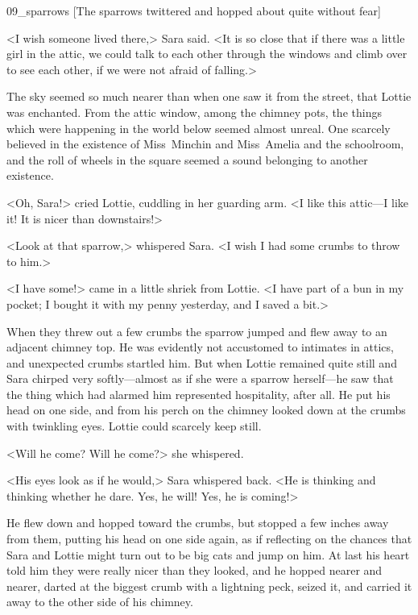 \begin{colorbigpic}
	[\basicscale]
	{09_sparrows}
	[The sparrows twittered and hopped about quite without fear]
\end{colorbigpic}

<I wish someone lived there,> Sara said. <It is so close that if there was a little girl in the attic, we could talk to each other through the windows and climb over to see each other, if we were not afraid of falling.>

The sky seemed so much nearer than when one saw it from the street, that Lottie was enchanted. From the attic window, among the chimney pots, the things which were happening in the world below seemed almost unreal. One scarcely believed in the existence of Miss~Minchin and Miss~Amelia and the schoolroom, and the roll of wheels in the square seemed a sound belonging to another existence.

<Oh, Sara!> cried Lottie, cuddling in her guarding arm. <I like this attic—I like it! It is nicer than downstairs!>

<Look at that sparrow,> whispered Sara. <I wish I had some crumbs to throw to him.>

<I have some!> came in a little shriek from Lottie. <I have part of a bun in my pocket; I bought it with my penny yesterday, and I saved a bit.>

When they threw out a few crumbs the sparrow jumped and flew away to an adjacent chimney top. He was evidently not accustomed to intimates in attics, and unexpected crumbs startled him. But when Lottie remained quite still and Sara chirped very softly—almost as if she were a sparrow herself—he saw that the thing which had alarmed him represented hospitality, after all. He put his head on one side, and from his perch on the chimney looked down at the crumbs with twinkling eyes. Lottie could scarcely keep still.

<Will he come? Will he come?> she whispered.

<His eyes look as if he would,> Sara whispered back. <He is thinking and thinking whether he dare. Yes, he will! Yes, he is coming!>

He flew down and hopped toward the crumbs, but stopped a few inches away from them, putting his head on one side again, as if reflecting on the chances that Sara and Lottie might turn out to be big cats and jump on him. At last his heart told him they were really nicer than they looked, and he hopped nearer and nearer, darted at the biggest crumb with a lightning peck, seized it, and carried it away to the other side of his chimney.

